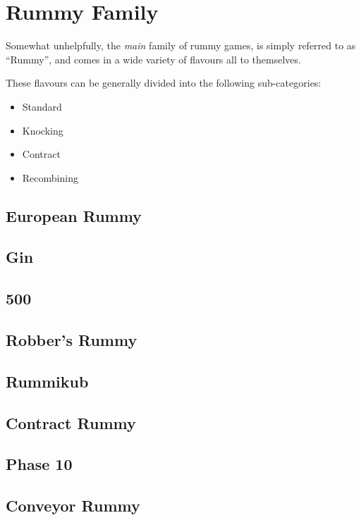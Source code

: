 \chapter{Rummy Family}
Somewhat unhelpfully, the \textit{main} family of rummy games, is simply referred to as ``Rummy'', and comes in a wide variety of flavours all to themselves.

These flavours can be generally divided into the following sub-categories:
\begin{itemize}
    \item Standard
    \item Knocking
    \item Contract
    \item Recombining
\end{itemize}

\section{European Rummy}

\section{Gin}

\section{500}

\section{Robber's Rummy}

\section{Rummikub}

\section{Contract Rummy}

\section{Phase 10}

\section{Conveyor Rummy}